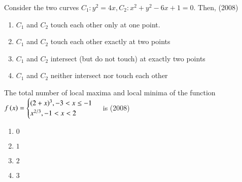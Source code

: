 \documentclass[journal,12pt,twocolumn]{IEEEtran}
\theoremstyle{remark}
\begin{document}

   
      \item
	      Consider the two curves $C_{1}:y^2=4x,$$C_{2}:x^2+y^2-6x+1=0.$ Then,  \hfill(2008)
     \begin{enumerate}
      \item $C_{1}$ and $C_{2}$ touch each other only at one point.
    
      \item $C_{1}$ and $C_{2}$ touch each other exactly at two points

      \item $C_{1}$ and $C_{2}$ intersect (but do not touch) at exactly two points

      \item $C_{1}$ and $C_{2}$ neither intersect nor touch each other \\
     
    \end{enumerate}
 
    \item 
    The total number of local maxima and local minima of the function \\
   
   $ f\left(x\right)=\begin{cases} 
   (2+x)^3, -3<x\le -1\\
   x^{2/3} ,-1<x<2
   \end{cases}$ is
   \hfill(2008)
    \begin{enumerate}
     \item $0$ 
     \item $1$
     \item $2$ 
     \item $3$ \\
    \end{enumerate}   
\end{document}
